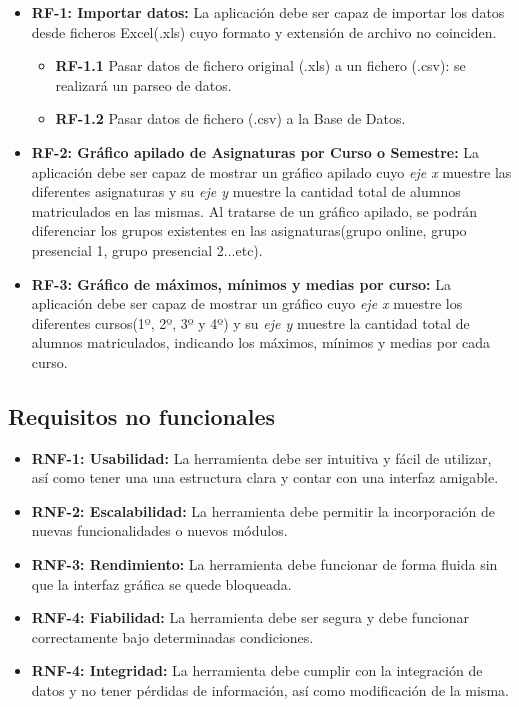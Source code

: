 \begin{itemize}
	\item \textbf{RF-1: Importar datos:} La aplicación debe ser capaz de importar los datos desde ficheros Excel(.xls) cuyo formato y extensión de archivo no coinciden.
	\begin{itemize}
		\item \textbf{RF-1.1} Pasar datos de fichero original (.xls) a un fichero (.csv): se realizará un parseo de datos.
		\item \textbf{RF-1.2} Pasar datos de fichero (.csv) a la Base de Datos.
	\end{itemize}
	
	\item \textbf{RF-2: Gráfico apilado de Asignaturas por Curso o Semestre:} La aplicación debe ser capaz de mostrar un gráfico apilado cuyo \emph{eje x} muestre las diferentes asignaturas y su \emph{eje y} muestre la cantidad total de alumnos matriculados en las mismas. Al tratarse de un gráfico apilado, se podrán diferenciar los grupos existentes en las asignaturas(grupo online, grupo presencial 1, grupo presencial 2...etc).
	
	\item \textbf{RF-3: Gráfico de máximos, mínimos y medias por curso:} La aplicación debe ser capaz de mostrar un gráfico cuyo \emph{eje x} muestre los diferentes cursos(1º, 2º, 3º y 4º) y su \emph{eje y} muestre la cantidad total de alumnos matriculados, indicando los máximos, mínimos y medias por cada curso.

\end{itemize}


\subsection{Requisitos no funcionales}

\begin{itemize}
\item
\textbf{RNF-1: Usabilidad:} La herramienta debe ser intuitiva y fácil de utilizar, así como tener una una estructura clara y contar con una interfaz amigable.
\item
\textbf{RNF-2: Escalabilidad:} La herramienta debe permitir la incorporación de nuevas funcionalidades o nuevos módulos. 
\item
\textbf{RNF-3: Rendimiento:} La herramienta debe funcionar de forma fluida sin que la interfaz gráfica se quede bloqueada.
\item
\textbf{RNF-4: Fiabilidad:} La herramienta debe ser segura y debe funcionar correctamente bajo determinadas condiciones.  
\item
\textbf{RNF-4: Integridad:} La herramienta debe cumplir con la integración de datos y no tener pérdidas de información, así como modificación de la misma. 

\end{itemize}
\newpage


